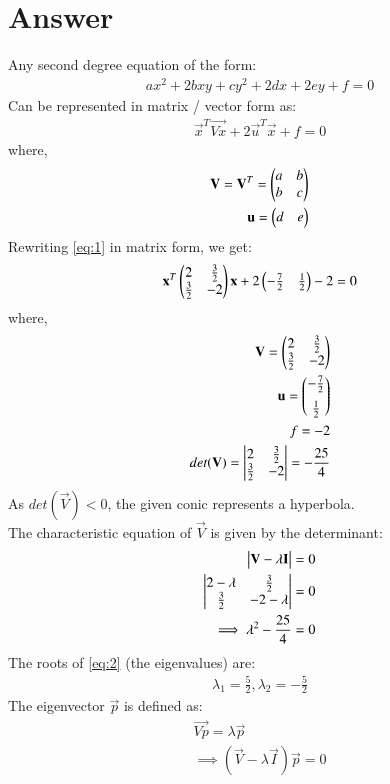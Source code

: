 \documentclass[journal,12pt,twocolumn]{IEEEtran}
\begin{document}
\section{Answer}
Any second degree equation of the form:
\begin{align}
  ax^2 + 2bxy + cy^2 + 2dx + 2ey + f = 0
\end{align}
Can be represented in matrix / vector form as:
\begin{align}
  \vec{x}^T\vec{Vx} + 2\vec{u}^T\vec{x} + f = 0
\end{align}
where,
\begin{align}
  \mathbf{V} = \mathbf{V}^T = \begin{pmatrix}a & b \\ b & c\end{pmatrix} \\
  \mathbf{u} = \begin{pmatrix}d & e\end{pmatrix}
\end{align}
Rewriting \eqref{eq:1} in matrix form, we get:
\begin{align}
  \mathbf{x}^T\begin{pmatrix}2 & \frac{3}{2} \\\frac{3}{2} & -2\end{pmatrix}\mathbf{x} + 2\begin{pmatrix}-\frac{7}{2} & \frac{1}{2}\end{pmatrix} - 2 = 0
\end{align}
where,
\begin{align}
  \mathbf{V} = \begin{pmatrix}2 & \frac{3}{2} \\\frac{3}{2} & -2\end{pmatrix} \\
  \mathbf{u} = \begin{pmatrix}-\frac{7}{2} \\[0.2cm] \frac{1}{2}\end{pmatrix} \\
  f = -2 \\
  det(\mathbf{V}) = \begin{vmatrix}2 & \frac{3}{2} \\\frac{3}{2} & -2\end{vmatrix} = -\frac{25}{4}
\end{align}
As $det(\vec{V}) < 0$, the given conic represents a hyperbola. \\
The characteristic equation of $\vec{V}$ is given by the determinant:
\begin{align}
  \begin{vmatrix}\mathbf{V} - \lambda\mathbf{I}\end{vmatrix} = 0 \\
  \begin{vmatrix}2 - \lambda & \frac{3}{2} \\\frac{3}{2} & -2 - \lambda\end{vmatrix} = 0 \\
  \implies \lambda^{2} - \frac{25}{4} = 0 \label{eq:2}
\end{align}
The roots of \eqref{eq:2} (the eigenvalues) are:
\begin{align}
  \lambda_1 = \frac{5}{2}, \lambda_2 = -\frac{5}{2}
\end{align}
The eigenvector $\vec{p}$ is defined as:
\begin{align}
  \vec{Vp} = \lambda \vec{p} \\
  \implies (\vec{V} - \lambda \vec{I})\vec{p} = 0 \label{eq:3}
\end{align}
\end{document}
